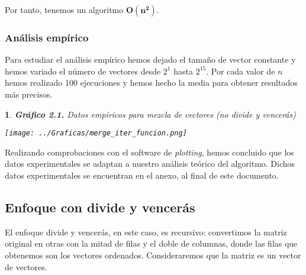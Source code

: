 \documentclass[10pt, a4paper]{article}
\theoremstyle{theorem-style}
\newtheorem*{datos}{}
\theoremstyle{theorem-style}
\theoremstyle{definition-style}
\theoremstyle{remark-style}
\theoremstyle{example-style}
\theoremstyle{definition-style}
\theoremstyle{remark-style}
\begin{document}
Por tanto, tenemos un algoritmo $\boldsymbol{O(n^2)}$.

\pagebreak

\subsubsection{Análisis empírico}

Para estudiar el análisis empírico hemos dejado el tamaño de vector constante y hemos variado el número de vectores desde $2^1$ hasta $2^{15}$. Por cada valor de $n$ hemos realizado 100 ejecuciones y hemos hecho la media para obtener resultados más precisos.

\begin{datos}
	{\bf\sffamily Gráfico 2.1.} {\sffamily Datos empíricos para mezcla de vectores (no divide y vencerás)}\\
	\vspace{-0.7cm}
	\begin{center}
		\texttt{[image: ../Graficas/merge\_iter\_funcion.png]}
	\end{center}	
\end{datos}

Realizando comprobaciones con el software de \emph{plotting}, hemos concluido que los datos experimentales se adaptan a nuestro análisis teórico del algoritmo. Dichos datos experimentales se encuentran en el anexo, al final de este documento.

\pagebreak

\subsection{Enfoque con divide y vencerás}

El enfoque divide y vencerás, en este caso, es recursivo: convertimos la matriz original en otras con la mitad de filas y el doble de columnas, donde las filas que obtenemos son los vectores ordenados. Consideraremos que la matriz es un vector de vectores.\\
\end{document}
